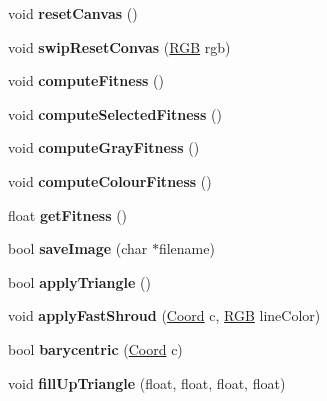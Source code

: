 \begin{DoxyCompactItemize}
void {\bfseries reset\+Canvas} ()
\item 
\hypertarget{classTriangleCanvas_aa0eeb07e399d8e18b3bae17e9a210153}{}\label{classTriangleCanvas_aa0eeb07e399d8e18b3bae17e9a210153} 
void {\bfseries swip\+Reset\+Convas} (\hyperlink{structRGB}{R\+GB} rgb)
\item 
\hypertarget{classTriangleCanvas_af1b95bcc904666e4e115c226b1bd3519}{}\label{classTriangleCanvas_af1b95bcc904666e4e115c226b1bd3519} 
void {\bfseries compute\+Fitness} ()
\item 
\hypertarget{classTriangleCanvas_a8a7597fb1f3ceebec8182823227bec2c}{}\label{classTriangleCanvas_a8a7597fb1f3ceebec8182823227bec2c} 
void {\bfseries compute\+Selected\+Fitness} ()
\item 
\hypertarget{classTriangleCanvas_a8673a70adf6ff35b5d888e7f75db5f27}{}\label{classTriangleCanvas_a8673a70adf6ff35b5d888e7f75db5f27} 
void {\bfseries compute\+Gray\+Fitness} ()
\item 
\hypertarget{classTriangleCanvas_a0bca64c9fff28f52cbe65f1c0af8dfba}{}\label{classTriangleCanvas_a0bca64c9fff28f52cbe65f1c0af8dfba} 
void {\bfseries compute\+Colour\+Fitness} ()
\item 
\hypertarget{classTriangleCanvas_adb21c8969fbc35cda652754822f46045}{}\label{classTriangleCanvas_adb21c8969fbc35cda652754822f46045} 
float {\bfseries get\+Fitness} ()
\item 
\hypertarget{classTriangleCanvas_a87c09d66ee9fbc7a758932ab580b527a}{}\label{classTriangleCanvas_a87c09d66ee9fbc7a758932ab580b527a} 
bool {\bfseries save\+Image} (char $\ast$filename)
\item 
\hypertarget{classTriangleCanvas_ac73a8f54c7f10f10c3006cc7e4d3e941}{}\label{classTriangleCanvas_ac73a8f54c7f10f10c3006cc7e4d3e941} 
bool {\bfseries apply\+Triangle} ()
\item 
\hypertarget{classTriangleCanvas_a831c0490c8002d4482ec97ddc5f6ac88}{}\label{classTriangleCanvas_a831c0490c8002d4482ec97ddc5f6ac88} 
void {\bfseries apply\+Fast\+Shroud} (\hyperlink{structCoord}{Coord} c, \hyperlink{structRGB}{R\+GB} line\+Color)
\item 
\hypertarget{classTriangleCanvas_a21b09c3ba693424be13691f73b94278d}{}\label{classTriangleCanvas_a21b09c3ba693424be13691f73b94278d} 
bool {\bfseries barycentric} (\hyperlink{structCoord}{Coord} c)
\item 
\hypertarget{classTriangleCanvas_a840b34659423ae8e1ee7ee878d220eeb}{}\label{classTriangleCanvas_a840b34659423ae8e1ee7ee878d220eeb} 
void {\bfseries fill\+Up\+Triangle} (float, float, float, float)
\end{DoxyCompactItemize}
